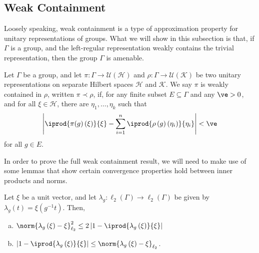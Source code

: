 \subsection{Weak Containment}%
Loosely speaking, weak containment is a type of approximation property for unitary representations of groups. What we will show in this subsection is that, if $\Gamma$ is a group, and the left-regular representation weakly contains the trivial representation, then the group $\Gamma$ is amenable.
\begin{definition}
  Let $\Gamma$ be a group, and let $\pi\colon \Gamma\rightarrow \mathcal{U}\left( \mathcal{H} \right)$ and $\rho\colon \Gamma\rightarrow \mathcal{U}\left( \mathcal{K} \right)$ be two unitary representations on separate Hilbert spaces $\mathcal{H}$ and $\mathcal{K}$. We say $\pi$ is weakly contained in $\rho$, written $\pi\prec \rho$, if, for any finite subset $E\subseteq \Gamma$ and any $\ve > 0$, and for all $\xi\in \mathcal{H}$, there are $\eta_1,\dots,\eta_k$ such that
  \begin{align*}
    \left\vert \iprod{\pi(g)\left( \xi \right)}{\xi} - \sum_{i=1}^{n} \iprod{\rho\left( g \right)\left( \eta_i \right)}{\eta_i} \right\vert < \ve
  \end{align*}
  for all $g \in E$.
\end{definition}
In order to prove the full weak containment result, we will need to make use of some lemmas that show certain convergence properties hold between inner products and norms.
\begin{lemma}\label{lemma:complex_identities_left_regular_representation}
  Let $\xi$ be a unit vector, and let $\lambda_g\colon \ell_2\left( \Gamma \right)\rightarrow \ell_2\left( \Gamma \right)$ be given by $\lambda_g\left( t \right) = \xi\left( g^{-1}t \right)$. Then,
  \begin{enumerate}[(a)]
    \item $\displaystyle \norm{\lambda_g\left( \xi \right) - \xi}_{\ell_2}^2 \leq 2\left\vert 1- \iprod{\lambda_g\left( \xi \right)}{\xi} \right\vert$
    \item $\displaystyle \left\vert 1- \iprod{\lambda_g\left( \xi \right)}{\xi} \right\vert \leq \norm{\lambda_g\left( \xi \right) - \xi}_{\ell_2}$.
  \end{enumerate}
\end{lemma}
